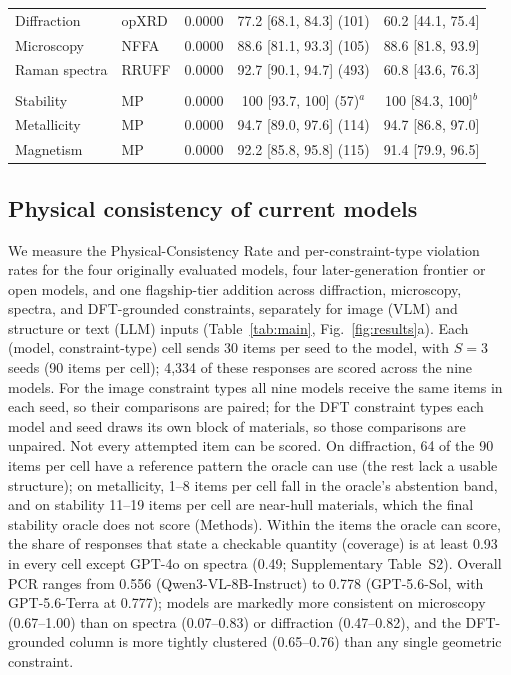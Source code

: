 \documentclass[pdflatex,sn-nature]{sn-jnl}
\newcommand{\rev}[1]{#1}
\newcommand{\rev}[1]{{\color{blue}#1}}
\begin{document}
\begin{table}[t]
{\begin{tabular}{l l S[table-format=1.4] c c}
Diffraction & opXRD & 0.0000 & 77.2 \rev{[68.1, 84.3]} (101) & \rev{60.2 [44.1, 75.4]} \\
Microscopy & NFFA       & 0.0000 & 88.6 \rev{[81.1, 93.3]} (105) & \rev{88.6 [81.8, 93.9]} \\
Raman spectra & RRUFF & 0.0000 & 92.7 \rev{[90.1, 94.7]} (493) & \rev{60.8 [43.6, 76.3]} \\
\addlinespace
{}\\
Stability & MP & 0.0000 & \rev{100 [93.7, 100] (57)$^{a}$} & \rev{100 [84.3, 100]$^{b}$} \\
Metallicity & MP & 0.0000 & 94.7 \rev{[89.0, 97.6]} (114) & \rev{94.7 [86.8, 97.0]} \\
Magnetism & MP & 0.0000 & 92.2 \rev{[85.8, 95.8]} (115) & \rev{91.4 [79.9, 96.5]} \\
\bottomrule
\end{tabular}}
\end{table}

\subsection*{Physical consistency of current models}
We measure the Physical-Consistency Rate and per-constraint-type violation rates for
the four originally evaluated models, four later-generation frontier or open models, and
one flagship-tier addition
across diffraction, microscopy, spectra, and
DFT-grounded constraints, separately for image (VLM) and structure or text (LLM)
inputs (Table~\ref{tab:main}, Fig.~\ref{fig:results}a)\rev{. Each (model, constraint-type) cell
sends 30 items per seed to the model, with $S=3$ seeds (90 items per cell); 4{,}334 of these
responses are scored across the nine models. For the image constraint types all nine models
receive the same items in each seed, so their comparisons are paired; for the DFT constraint
types each model and seed draws its own block of materials, so those comparisons are unpaired.
Not every attempted item can be scored. On diffraction, 64 of the 90 items per cell have a
reference pattern the oracle can use (the rest lack a usable structure); on metallicity, 1--8
items per cell fall in the oracle's abstention band, and on stability 11--19 items per cell are
near-hull materials, which the final stability oracle does not score (Methods). Within the items the oracle can score, the
share of responses that state a checkable quantity (coverage) is at least 0.93 in every cell
except GPT-4o on spectra (0.49; Supplementary Table~S2).} Overall PCR ranges from \rev{0.556
(Qwen3-VL-8B-Instruct) to 0.778 (GPT-5.6-Sol, with GPT-5.6-Terra at 0.777)}; models are
markedly more consistent on microscopy (0.67--1.00) than on spectra (0.07--0.83) or
diffraction (0.47--0.82), and the DFT-grounded column is more tightly clustered
(\rev{0.65--0.76}) than any single geometric constraint\rev{.}
\end{document}
